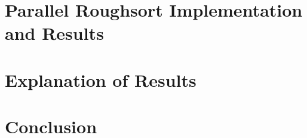 \documentclass[letterpaper, 12pt]{article}
\begin{document}
\clearpage
\section{Parallel Roughsort Implementation and Results}

\begin{sidewaysfigure}

\vspace{-4ex}
\caption{\label{fig:k2}{\em
  Sort Runtimes over Arrays of Length $n\cdot 10^6$, $k = 2$
}}
\end{sidewaysfigure}

\begin{sidewaysfigure}

\vspace{-4ex}
\caption{\label{fig:k15}{\em
  Sort Runtimes over Arrays of Length $n\cdot 10^6$, $k = 15$
}}
\end{sidewaysfigure}

\begin{sidewaysfigure}

\vspace{-4ex}
\caption{\label{fig:n750k}{\em
  Sort Runtimes over Arrays of Radius $k$, $n = 0.75\cdot 10^6$
}}
\end{sidewaysfigure}

\begin{sidewaysfigure}

\vspace{-4ex}
\caption{\label{fig:n1250k}{\em
  Sort Runtimes over Arrays of Radius $k$, $n = 1.25\cdot 10^6$
}}
\end{sidewaysfigure}

\clearpage
\section{Explanation of Results}

\section{Conclusion}

\clearpage

\nocite{*}
\end{document}
